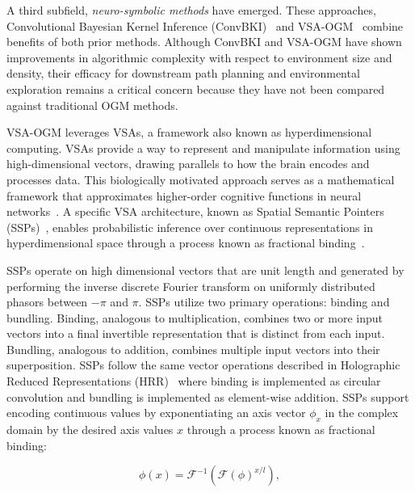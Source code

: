 A third subfield, \textit{neuro-symbolic methods} have emerged. These approaches, Convolutional Bayesian Kernel Inference (ConvBKI)~\cite{wilson2022convolutional} and VSA-OGM~\cite{snyder2024brain} combine benefits of both prior methods. Although ConvBKI and VSA-OGM have shown improvements in algorithmic complexity with respect to environment size and density, their efficacy for downstream path planning and environmental exploration remains a critical concern because they have not been compared against traditional OGM methods.

VSA-OGM leverages VSAs, a framework also known as hyperdimensional computing. VSAs provide a way to represent and manipulate information using high-dimensional vectors, drawing parallels to how the brain encodes and processes data. This biologically motivated approach serves as a mathematical framework that approximates higher-order cognitive functions in neural networks~\cite{10.1016/0004-3702(90)90007-M, eliasmith2013build}. A specific VSA architecture, known as Spatial Semantic Pointers (SSPs)~\cite{eliasmith2013build}, enables probabilistic inference over continuous representations in hyperdimensional space through a process known as fractional binding~\cite{komer2020biologically}.

SSPs operate on high dimensional vectors that are unit length and generated by performing the inverse discrete Fourier transform on uniformly distributed phasors between $-\pi$ and $\pi$. SSPs utilize two primary operations: binding 
and bundling. Binding, analogous to multiplication, combines two or more input vectors into a final invertible
representation that is distinct from each input. Bundling, analogous to addition, combines multiple input
vectors into their superposition. SSPs follow the same vector operations described in Holographic Reduced Representations (HRR)~\cite{plate1991holographic} where binding is implemented as circular convolution and bundling is implemented as element-wise addition. SSPs support encoding continuous values by exponentiating an axis vector $\phi_x$ in the complex domain by the desired axis values $x$ through a process known as fractional binding:

\begin{equation}
    \phi(x) = \mathcal{F}^{-1}(\mathcal{F}(\phi)^{x/l}),
\end{equation}


